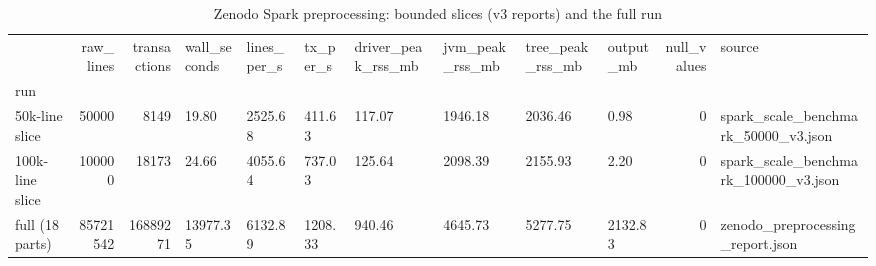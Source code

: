 \begin{table}
\caption{Zenodo Spark preprocessing: bounded slices (v3 reports) and the full run}
\label{tab:01A_zenodo_scaling}
\begin{tabular}{lrrlllllllrl}
\toprule
 & raw\_lines & transactions & wall\_seconds & lines\_per\_s & tx\_per\_s & driver\_peak\_rss\_mb & jvm\_peak\_rss\_mb & tree\_peak\_rss\_mb & output\_mb & null\_values & source \\
run &  &  &  &  &  &  &  &  &  &  &  \\
\midrule
50k-line slice & 50000 & 8149 & 19.80 & 2525.68 & 411.63 & 117.07 & 1946.18 & 2036.46 & 0.98 & 0 & spark\_scale\_benchmark\_50000\_v3.json \\
100k-line slice & 100000 & 18173 & 24.66 & 4055.64 & 737.03 & 125.64 & 2098.39 & 2155.93 & 2.20 & 0 & spark\_scale\_benchmark\_100000\_v3.json \\
full (18 parts) & 85721542 & 16889271 & 13977.35 & 6132.89 & 1208.33 & 940.46 & 4645.73 & 5277.75 & 2132.83 & 0 & zenodo\_preprocessing\_report.json \\
\bottomrule
\end{tabular}
\end{table}
